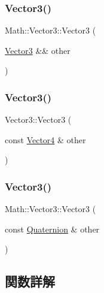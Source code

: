 \subsubsection{\texorpdfstring{Vector3()}{Vector3()}\hspace{0.1cm}{\footnotesize\ttfamily [4/6]}}
{\footnotesize\ttfamily Math\+::\+Vector3\+::\+Vector3 (\begin{DoxyParamCaption}\item[{\mbox{\hyperlink{struct_math_1_1_vector3}{Vector3}} \&\&}]{other }\end{DoxyParamCaption})}

\mbox{\label{struct_math_1_1_vector3_a24b565cff89d2bd9310b047bbf24de06}} 
\subsubsection{\texorpdfstring{Vector3()}{Vector3()}\hspace{0.1cm}{\footnotesize\ttfamily [5/6]}}
{\footnotesize\ttfamily Vector3\+::\+Vector3 (\begin{DoxyParamCaption}\item[{const \mbox{\hyperlink{struct_math_1_1_vector4}{Vector4}} \&}]{other }\end{DoxyParamCaption})}

\mbox{\label{struct_math_1_1_vector3_abec6ffc22cfc35a66faa87410a52b772}} 
\subsubsection{\texorpdfstring{Vector3()}{Vector3()}\hspace{0.1cm}{\footnotesize\ttfamily [6/6]}}
{\footnotesize\ttfamily Math\+::\+Vector3\+::\+Vector3 (\begin{DoxyParamCaption}\item[{const \mbox{\hyperlink{struct_math_1_1_quaternion}{Quaternion}} \&}]{other }\end{DoxyParamCaption})}



\subsection{関数詳解}
\mbox{\label{struct_math_1_1_vector3_a8c5c7e6140a72c6ae5ec07027787a270}} 
